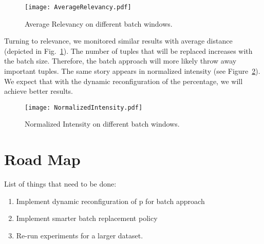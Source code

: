 \begin{figure}[t]
\centering
\texttt{[image: AverageRelevancy.pdf]}
\caption{Average Relevancy on different batch windows.}
\label{fig:avg-relevancy}
\end{figure}

Turning to relevance, we monitored similar results with 
average distance (depicted in Fig.~\ref{fig:avg-relevancy}). 
The number of tuples that will be replaced 
increases with the batch size. Therefore, the batch approach 
will more likely throw away important tuples. 
The same story appears in normalized intensity (see Figure~\ref{fig:norm-intensity}).
We expect that with the dynamic reconfiguration of the 
percentage, we will achieve better results.

\begin{figure}[t]
\centering
\texttt{[image: NormalizedIntensity.pdf]}
\caption{Normalized Intensity on different batch windows.}
\label{fig:norm-intensity}
\end{figure}

\section{Road Map}

List of things that need to be done:
\begin{enumerate}
\item	Implement dynamic reconfiguration of p for batch approach
\item	Implement smarter batch replacement policy
\item	Re-run experiments for a larger dataset.
\end{enumerate} 